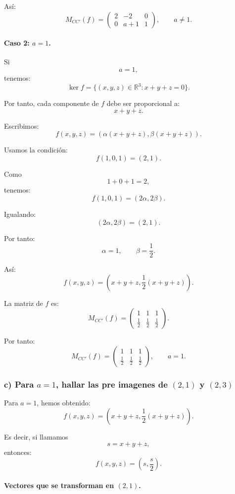 \documentclass[12pt]{article}
\begin{document}
Así:
\[
\boxed{
M_{CC'}(f)=
\begin{pmatrix}
2&-2&0\\
0&a+1&1
\end{pmatrix},
\qquad a\neq 1.
}
\]

\paragraph{Caso 2: \(a=1\).}

Si
\[
a=1,
\]
tenemos:
\[
\ker f=\{(x,y,z)\in\mathbb{R}^3:x+y+z=0\}.
\]

Por tanto, cada componente de \(f\) debe ser proporcional a:
\[
x+y+z.
\]

Escribimos:
\[
f(x,y,z)=(\alpha(x+y+z),\beta(x+y+z)).
\]

Usamos la condición:
\[
f(1,0,1)=(2,1).
\]

Como
\[
1+0+1=2,
\]
tenemos:
\[
f(1,0,1)=(2\alpha,2\beta).
\]

Igualando:
\[
(2\alpha,2\beta)=(2,1).
\]

Por tanto:
\[
\alpha=1,
\qquad
\beta=\frac{1}{2}.
\]

Así:
\[
f(x,y,z)=\left(x+y+z,\frac{1}{2}(x+y+z)\right).
\]

La matriz de \(f\) es:
\[
M_{CC'}(f)=
\begin{pmatrix}
1&1&1\\
\frac{1}{2}&\frac{1}{2}&\frac{1}{2}
\end{pmatrix}.
\]

Por tanto:
\[
\boxed{
M_{CC'}(f)=
\begin{pmatrix}
1&1&1\\
\frac{1}{2}&\frac{1}{2}&\frac{1}{2}
\end{pmatrix},
\qquad a=1.
}
\]

\subsubsection*{c) Para \(a=1\), hallar las pre imagenes de \((2,1)\) y \((2,3)\)}

Para \(a=1\), hemos obtenido:
\[
f(x,y,z)=\left(x+y+z,\frac{1}{2}(x+y+z)\right).
\]

Es decir, si llamamos
\[
s=x+y+z,
\]
entonces:
\[
f(x,y,z)=\left(s,\frac{s}{2}\right).
\]

\paragraph{Vectores que se transforman en \((2,1)\).}
\end{document}
